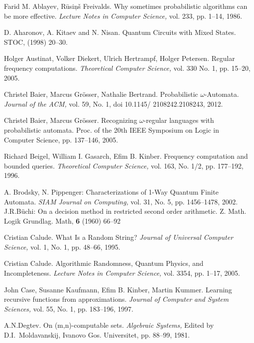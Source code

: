 \documentclass{llncs}
\begin{document}
\begin{thebibliography}{99}

Farid M. Ablayev, R\= usi\c n\v s Freivalds.
Why sometimes probabilistic algorithms can be more effective. 
{\em Lecture Notes in Computer Science,} vol. 233, pp. 1--14, 1986.

D. Aharonov, A. Kitaev and N. Nisan.
Quantum Circuits with Mixed States.
STOC, (1998) 20--30.


Holger Austinat, Volker Diekert, Ulrich Hertrampf, Holger Petersen.
Regular frequency computations.
{\em Theoretical Computer Science,} vol. 330 No. 1, pp. 15--20, 2005.

Christel Baier, Marcus Gr\" osser,  Nathalie Bertrand.
Probabilistic $\omega $-Automata.
{\em Journal of the ACM,} vol. 59, No. 1, doi 10.1145/ 2108242.2108243,  2012.


Christel Baier, Marcus Gr\" osser.
Recognizing $\omega$-regular languages with probabilistic automata.
Proc. of the 20th IEEE Symposium on Logic in Computer Science, pp. 137--146, 2005.



Richard Beigel, William I. Gasarch, Efim B. Kinber.
Frequency computation and bounded queries.
{\em Theoretical Computer Science,} vol. 163, No. 1/2, pp. 177--192, 1996. 

A. Brodsky, N. Pippenger:
Characterizations of 1-Way Quantum Finite Automata.
{\em SIAM Journal on Computing,} vol. 31, No. 5, pp. 1456--1478, 2002. 
%
J.R.B\"uchi:
On a decision method in restricted second order arithmetic. 
Z. Math. Logik Grundlag. Math, {\bf 6} (1960) 66--92
%
 

Cristian Calude.
What Is a Random String?
{\em Journal of Universal Computer Science,} vol. 1, No. 1, pp. 48--66, 1995.

Cristian Calude.
Algorithmic Randomness, Quantum Physics, and Incompleteness.
{\em Lecture Notes in Computer Science,} vol. 3354, pp. 1--17, 2005.

John Case, Susanne Kaufmann, Efim B. Kinber,  Martin Kummer.
Learning recursive functions from approximations.
{\em Journal of Computer and System Sciences,} vol. 55, No. 1, pp. 183--196, 1997. 
  



A.N.Degtev.
On (m,n)-computable sets.
{\em Algebraic Systems,} Edited by D.I.~Moldavanskij,	 Ivanovo Gos. Universitet, pp. 88--99, 1981. 


\end{thebibliography}
\end{document}
